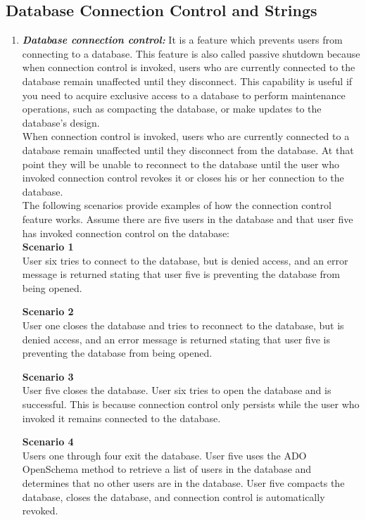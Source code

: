 \subsection{Database Connection Control and Strings}
\begin{enumerate}
\item \textbf{\emph{Database connection control:}} It is a feature which prevents users from connecting to a database. This feature is also called passive shutdown because when connection control is invoked, users who are currently connected to the database remain unaffected until they disconnect. This capability is useful if you need to acquire exclusive access to a database to perform maintenance operations, such as compacting the database, or make updates to the database's design.\\

When connection control is invoked, users who are currently connected to a database remain unaffected until they disconnect from the database. At that point they will be unable to reconnect to the database until the user who invoked connection control revokes it or closes his or her connection to the database.\\

The following scenarios provide examples of how the connection control feature works. Assume there are five users in the database and that user five has invoked connection control on the database:\\

\textbf{Scenario 1} \\
User six tries to connect to the database, but is denied access, and an error message is returned stating that user five is preventing the database from being opened.

\textbf{Scenario 2} \\
User one closes the database and tries to reconnect to the database, but is denied access, and an error message is returned stating that user five is preventing the database from being opened.

\textbf{Scenario 3}\\
User five closes the database. User six tries to open the database and is successful. This is because connection control only persists while the user who invoked it remains connected to the database.

\textbf{Scenario 4}\\
Users one through four exit the database. User five uses the ADO OpenSchema method to retrieve a list of users in the database and determines that no other users are in the database. User five compacts the database, closes the database, and connection control is automatically revoked.


\end{enumerate}
